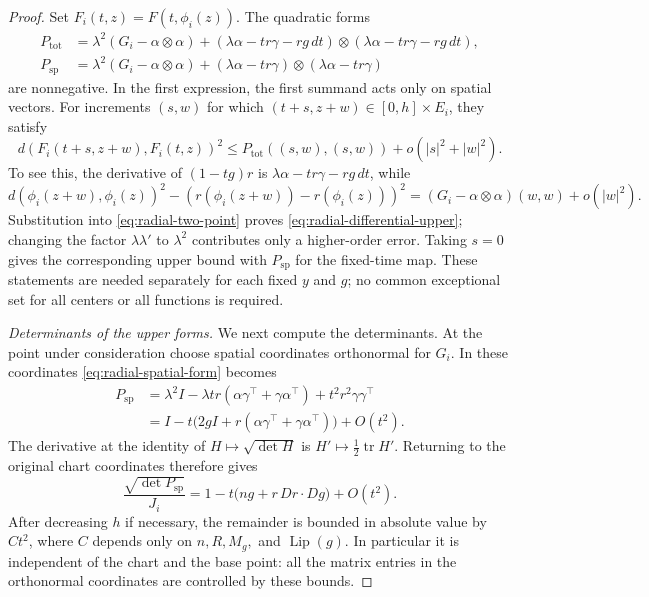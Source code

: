 \documentclass[11pt]{article}
\numberwithin{equation}{section}
\theoremstyle{definition}
\theoremstyle{remark}
\begin{document}
\begin{proof}
Set $F_i(t,z)=F(t,\phi_i(z))$.  The quadratic forms
\begin{align}
 P_{\mathrm{tot}}
 &=\lambda^2(G_i-\alpha\otimes\alpha)
   +(\lambda\alpha-tr\gamma-rg\,dt)
       \otimes(\lambda\alpha-tr\gamma-rg\,dt),
       \label{eq:radial-total-form}\\
 P_{\mathrm{sp}}
 &=\lambda^2(G_i-\alpha\otimes\alpha)
   +(\lambda\alpha-tr\gamma)\otimes(\lambda\alpha-tr\gamma)
       \label{eq:radial-spatial-form}
\end{align}
are nonnegative.  In the first expression, the first summand acts
only on spatial vectors.  For increments $(s,w)$ for which
$(t+s,z+w)\in[0,h]\times E_i$, they satisfy
\begin{equation}
 d(F_i(t+s,z+w),F_i(t,z))^2
 \leq P_{\mathrm{tot}}((s,w),(s,w))
       +o(|s|^2+|w|^2).
 \label{eq:radial-differential-upper}
\end{equation}
To see this, the derivative of $(1-tg)r$ is
$\lambda\alpha-tr\gamma-rg\,dt$, while
\[
 d(\phi_i(z+w),\phi_i(z))^2
 -(r(\phi_i(z+w))-r(\phi_i(z)))^2
 =(G_i-\alpha\otimes\alpha)(w,w)+o(|w|^2).
\]
Substitution into \eqref{eq:radial-two-point} proves
\eqref{eq:radial-differential-upper}; changing the factor
$\lambda\lambda'$ to $\lambda^2$ contributes only a higher-order
error.  Taking $s=0$ gives the corresponding upper bound with
$P_{\mathrm{sp}}$ for the fixed-time map.  These statements are
needed separately for each fixed $y$ and $g$; no common exceptional
set for all centers or all functions is required.

\emph{Determinants of the upper forms.}
We next compute the determinants.  At the point under consideration
choose spatial coordinates orthonormal for $G_i$.  In these
coordinates \eqref{eq:radial-spatial-form} becomes
\begin{align*}
 P_{\mathrm{sp}}
 &=\lambda^2 I-\lambda tr(\alpha\gamma^\top+
                         \gamma\alpha^\top)
                    +t^2r^2\gamma\gamma^\top\\
 &=I-t\bigl(2gI+r(\alpha\gamma^\top+
                         \gamma\alpha^\top)\bigr)+O(t^2).
\end{align*}
The derivative at the identity of $H\mapsto\sqrt{\det H}$ is
$H'\mapsto\tfrac12\operatorname{tr}H'$.  Returning to the original
chart coordinates therefore gives
\begin{equation}
 \frac{\sqrt{\det P_{\mathrm{sp}}}}{J_i}
 =1-t\bigl(ng+r\,Dr\cdot Dg\bigr)+O(t^2).
 \label{eq:radial-spatial-jacobian}
\end{equation}
After decreasing $h$ if necessary, the remainder is bounded in
absolute value by $Ct^2$, where $C$ depends only on
$n,R,M_g,$ and $\operatorname{Lip}(g)$.  In particular it is independent of the
chart and the base point: all the matrix entries in the orthonormal
coordinates are controlled by these bounds.


\end{proof}
\end{document}
